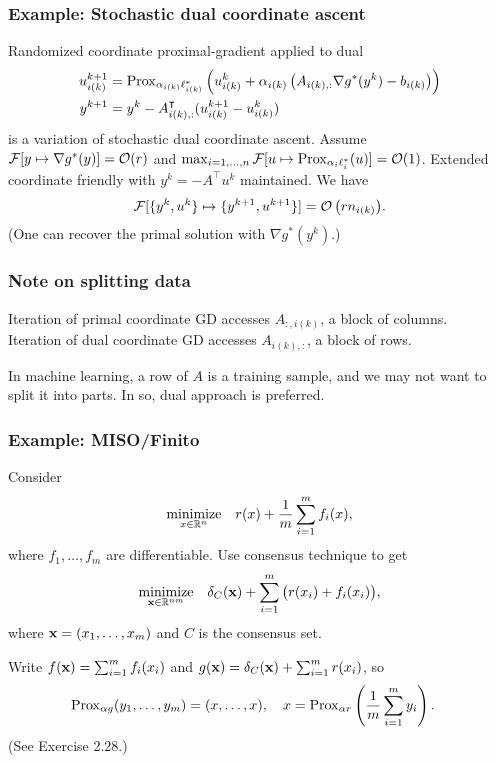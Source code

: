 \documentclass[10pt,mathserif]{beamer}
\begin{document}
\begin{frame}
\frametitle{Example: Stochastic dual coordinate ascent}
Randomized coordinate proximal-gradient applied to dual
\begin{align*}
  u^{k+1}_{i(k)} & = \mathrm{Prox}_{\alpha_{i(k)}\ell^*_{i(k)}}\left(u^{k}_{i(k)} + \alpha_{i(k)} \left(A_{i(k),:} \nabla g^*(y^k)-b_{i(k)}\right)\right)\\
  y^{k+1}&=y^k-A^\intercal_{i(k),:} (u^{k+1}_{i(k)}-u^k_{i(k)})
\end{align*}
is a variation of stochastic dual coordinate ascent.
Assume ${\mathcal{F}}[y\mapsto\nabla g^*(y)]={\mathcal{O}}(r)$ and $\max_{i=1,\dots,n}\mathcal{F}[u\mapsto \mathrm{Prox}_{\alpha_i \ell^*_i}(u)]=\mathcal{O}(1)$.
Extended coordinate friendly with $y^k=-A^\intercal u^k$ maintained.
We have
\[
{\mathcal{F}}[\{y^k,u^k\}\mapsto \{y^{k+1},u^{k+1}\}]={\mathcal{O}\left(rn_{i(k)}\right)}.
\]
(One can recover the primal solution with $\nabla g^*(y^k)$.)
\end{frame}

\begin{frame}
\frametitle{Note on splitting data}

Iteration of primal coordinate GD accesses $A_{:,i(k)}$, a block of columns.\\
Iteration of dual coordinate GD accesses $A_{i(k),:}$, a block of rows.

\vspace{0.2in}

In machine learning, a row of $A$ is a training sample, and we may not want to split it into parts. In so, dual approach is preferred.

\end{frame}


\begin{frame}[plain]
\frametitle{Example: MISO/Finito}
Consider 
\begin{align*}
\underset{x\in\mathbb{R}^n}{\mbox{minimize}}\quad r(x) + \frac{1}{m}\sum_{i=1}^{m}f_i(x) ,
\end{align*}
where $f_1,\dots,f_m$ are differentiable.
Use consensus technique to get
\begin{align*}
\underset{{\mathbf{x}}\in \mathbb{R}^{nm}}{\mbox{minimize}}\quad \delta_C({\mathbf{x}})+\sum_{i=1}^{m}\big(r(x_i)+f_i(x_i)\big),
\end{align*}
where ${\mathbf{x}}=(x_1,\dots,x_m)$ and $C$ is the consensus set.
\vspace{0.2in}

Write $f({\mathbf{x}})  =\sum_{i=1}^{m} f_i(x_i) $ and $g({\mathbf{x}})  = \delta_C({\mathbf{x}})+\sum_{i=1}^{m} r(x_i)$, so
\begin{align*}
  \mathrm{Prox}_{\alpha g}(y_1,\dots,y_m) & =  (x,\dots,x),\quad x= \mathrm{Prox}_{\alpha r}\left(\frac{1}{m}\sum_{i=1}^{m}y_i\right).
\end{align*}
(See Exercise 2.28.)
\end{frame}
\end{document}
